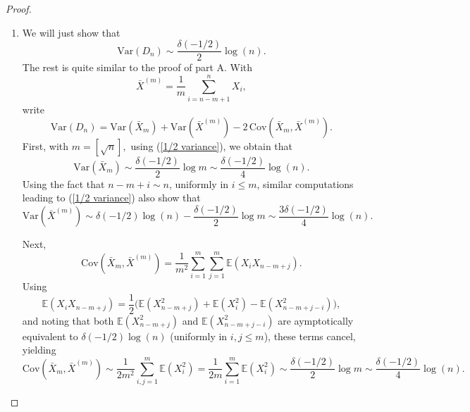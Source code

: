 \documentclass[10pt,a4paper]{amsart}
\numberwithin{equation}{section}
\begin{document}
\begin{proof}
\begin{enumerate}
\begin{eqnarray*}
{\left(\left\vert\sum_{j=s}^n\left(\frac{j}{n}-1\right)a_{j-s}\right\vert\right)}\\
&&=O\left(\sum_{s=1}^n\left[\frac{(n-s)^{1/2}}{n}+\left(1-\frac{s}{n}\right)(n-s)^{-1/2}\right]^2\right)
\end{eqnarray*}
and the sum inside the parentheses converges to 
$$
\int_0^14xdx=2.
$$
Summing over $s$ between $\min(k,k')$ and $\max(k,k')$ gives the following (taking $k<k'$)
\begin{eqnarray*}\lefteqn{
\frac{1}{n^2}\sum_{k'=1}^n\sum_{k=1}^{k'}\sum_{s=k}^{k'}
\left(\left\vert\sum_{j=s}^n\left(\frac{j}{n}-1\right)a_{j-s}\right\vert\right)\left(\left\vert\sum_{j=s}^{k'}\frac{j}{n}a_{j-s}\right\vert+\left\vert\sum_{j=k'+1}^n\left(\frac{j}{n}-1\right)a_{j-s}\right\vert\right)}\\
&&=O\left(\frac{1}{n}\sum_{k'=1}^n\sum_{s=1}^{k'}n^{-1/2}\left(\frac{k'-s}{n}\right)^{-1/2}n^{-1/2}\right).
\end{eqnarray*}
The sum converges to 
$$
\int_0^1\int_0^x(x-y)^{-1/2}dydx=\frac{4}{3}.
$$
This completes the proof of (\ref{third term}), which in turn completes the proof of (\ref{lim var}).
\item We will just show that 
\begin{equation}\label{dif var}
\textrm{Var}(D_n)\sim\frac{\delta(-1/2)}{2}\log(n).
\end{equation}
The rest is quite similar to the proof of part A. With
$$
\bar X^{(m)}=\frac{1}{m}\sum_{i=n-m+1}^nX_i,
$$
write
\[
\mathrm{Var}(D_n)
=\mathrm{Var}(\bar X_m)+\mathrm{Var}(\bar X^{(m)})
-2\,\mathrm{Cov}(\bar X_m,\bar X^{(m)}).
\]
First, with $m=[\sqrt{n}],$ using (\ref{1/2 variance}), we obtain that
$$
\mathrm{Var}(\bar X_m)\sim\frac{\delta(-1/2)}{2}\log m\sim\frac{\delta(-1/2)}{4}\log(n).
$$
Using the fact that $n-m+i\sim n$, uniformly in $i\le m$, similar computations leading to (\ref{1/2 variance}) also show that
$$
\mathrm{Var}(\bar X^{(m)})\sim
\delta(-1/2)\log(n)-\frac{\delta(-1/2)}{2}\log m\sim
\frac{3\delta(-1/2)}{4}\log(n).
$$

Next,
\[
\mathrm{Cov}(\bar X_m,\bar X^{(m)})
=\frac{1}{m^2}\sum_{i=1}^m\sum_{j=1}^m \mathbb{E}(X_iX_{n-m+j}).
\]
Using
\[
\mathbb{E}(X_iX_{n-m+j})
=\frac12\Big(
\mathbb{E}(X_{n-m+j}^2)+\mathbb{E}(X_i^2)-\mathbb{E}(X_{n-m+j-i}^2)
\Big),
\]
and noting that both $\mathbb{E}(X_{n-m+j}^2)$ and $\mathbb{E}(X_{n-m+j-i}^2)$ are aymptotically equivalent  to $\delta(-1/2)\log(n)$ (uniformly in $i,j\le m$), these terms cancel, yielding
\[
\mathrm{Cov}(\bar X_m,\bar X^{(m)})
\sim \frac{1}{2m^2}\sum_{i,j=1}^m \mathbb{E}(X_i^2)
=\frac{1}{2m}\sum_{i=1}^m \mathbb{E}(X_i^2)
\sim \frac{\delta(-1/2)}{2}\log m
\sim \frac{\delta(-1/2)}{4}\log(n).
\]


\end{enumerate}
\end{proof}
\end{document}
